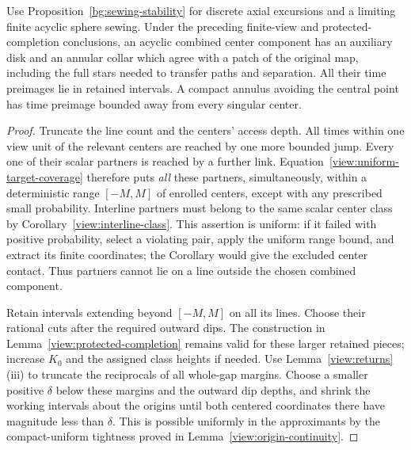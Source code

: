 \begin{lemma}
\label{view:protected-lattice-patch}
Use Proposition~\ref{bg:sewing-stability} for discrete axial
excursions and a limiting finite acyclic sphere sewing.  Under the preceding
finite-view and protected-completion conclusions, an acyclic combined
center component has an auxiliary disk and an annular collar which agree
with a patch of the original map, including the full stars needed to
transfer paths and separation.  All their time preimages lie in retained
intervals.  A compact annulus avoiding the central point has time preimage
bounded away from every singular center.
\end{lemma}

\begin{proof}
Truncate the line count and the centers' access depth.  All times within
one view unit of the relevant centers are reached by one more bounded
jump.  Every one of their scalar partners is reached by a further link.
Equation~\eqref{view:uniform-target-coverage} therefore puts \emph{all}
these partners, simultaneously, within a deterministic range $[-M,M]$
of enrolled centers, except with any prescribed small probability.
Interline partners must belong to the same scalar center class by
Corollary~\ref{view:interline-class}.  This assertion is uniform: if it
failed with positive probability, select a violating pair, apply the
uniform range bound, and extract its finite coordinates; the Corollary
would give the excluded center contact.  Thus partners cannot lie on a
line outside the chosen combined component.

Retain intervals extending beyond $[-M,M]$ on all its lines.  Choose
their rational cuts after the required outward dips.  The construction
in Lemma~\ref{view:protected-completion} remains valid for these larger
retained pieces; increase $K_0$ and the assigned class heights if needed.
Use Lemma~\ref{view:returns}(iii) to truncate the reciprocals of all
whole-gap margins.  Choose a smaller positive $\delta$ below these
margins and the outward dip depths, and shrink the working intervals
about the origins until both centered coordinates there have magnitude
less than $\delta$.  This is possible uniformly in the approximants by
the compact-uniform tightness proved in
Lemma~\ref{view:origin-continuity}.


\end{proof}
